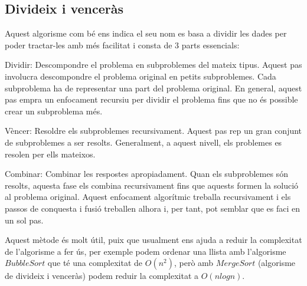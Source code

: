 \subsection{Divideix i venceràs}

Aquest algorisme com bé ens indica el seu nom es basa a dividir les dades per poder tractar-les amb més facilitat i consta de 3 parts essencials: \newline

Dividir: Descompondre el problema en subproblemes del mateix tipus. Aquest pas involucra descompondre el problema original en petits subproblemes. Cada subproblema ha de representar una part del problema original. En general, aquest pas empra un enfocament recursiu per dividir el problema fins que no és possible crear un subproblema més. \newline

Vèncer: Resoldre els subproblemes recursivament. Aquest pas rep un gran conjunt de subproblemes a ser resolts. Generalment, a aquest nivell, els problemes es resolen per ells mateixos. \newline

Combinar: Combinar les respostes apropiadament. Quan els subproblemes són resolts, aquesta fase els combina recursivament fins que aquests formen la solució al problema original. Aquest enfocament algorítmic treballa recursivament i els passos de conquesta i fusió treballen alhora i, per tant, pot semblar que es faci en un sol pas. \newline

Aquest mètode és molt útil, puix que usualment ens ajuda a reduir la complexitat de l'algorisme a fer ús, per exemple podem ordenar una llista amb l'algorisme $Bubble Sort$ que té una complexitat de $O(n^2)$, però amb $Merge Sort$ (algorisme de divideix i venceràs) podem reduir la complexitat a $O(n log n)$.